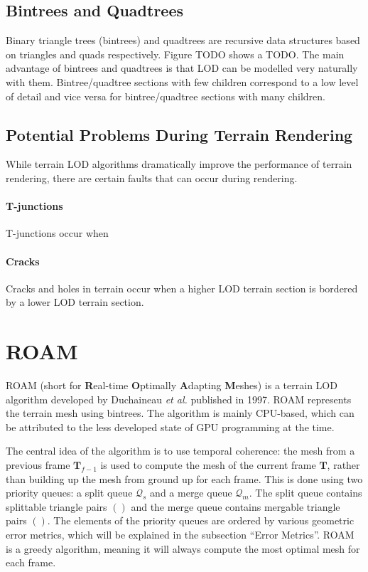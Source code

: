 \subsection{Bintrees and Quadtrees}
Binary triangle trees (bintrees) and quadtrees are 
recursive data structures based on triangles and quads respectively.
Figure TODO shows a TODO.
The main advantage of bintrees and quadtrees is that 
LOD can be modelled very naturally with them.
Bintree/quadtree sections with few children correspond to a low level of detail and 
vice versa for bintree/quadtree sections with many children.

\subsection{Potential Problems During Terrain Rendering}
While terrain LOD algorithms dramatically improve the performance of terrain rendering, 
there are certain faults that can occur during rendering. 
\paragraph{T-junctions} T-junctions occur when 
\paragraph{Cracks} Cracks and holes in terrain occur when a higher LOD terrain section is bordered 
by a lower LOD terrain section. 

\section{ROAM}
ROAM (short for \textbf{R}eal-time \textbf{O}ptimally \textbf{A}dapting \textbf{M}eshes) 
is a terrain LOD algorithm developed by Duchaineau \textit{et al.} \cite{roam} published in 1997.
ROAM represents the terrain mesh using bintrees. The algorithm is mainly CPU-based, which 
can be attributed to the less developed state of GPU programming at the time.

The central idea of the algorithm is to use temporal coherence: the mesh from a previous frame $\mathbf{T}_{f-1}$ is used to compute 
the mesh of the current frame $\mathbf{T}$, rather than building up the mesh from ground up for each frame.
This is done using two priority queues: a split queue $\mathcal{Q}_s$ and a merge queue $\mathcal{Q}_m$.
The split queue contains splittable triangle pairs $()$
and the merge queue contains mergable triangle pairs $()$.
The elements of the priority queues are ordered by 
various geometric error metrics, which will be explained in the subsection ``Error Metrics''.
ROAM is a greedy algorithm, meaning it will always compute the most optimal mesh for each frame.

